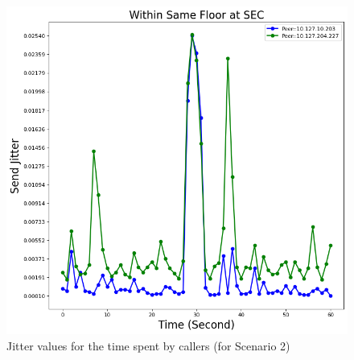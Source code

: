 	\begin{figure}[!b]
		\begin{minipage}{\textwidth}
			\includegraphics[scale=0.38]{Images/experiment/senarios/df_in_floor.png}
		\end{minipage}
		\caption{Jitter values for the time spent by callers (for Scenario 2)}
		\label{fig:scene-out-2}
	\end{figure}

